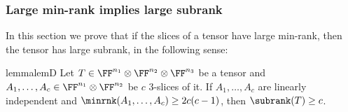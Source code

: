 \subsubsection{Large min-rank implies large subrank}\label{subsec:minrank-subrank}

In this section we prove that if the slices of a tensor have large min-rank, then the tensor has large subrank, in the following sense:


\begin{restatable}{lemma}{lemD}
%
\label{cla-high-rank-high-subrank}
Let $T\in\FF^{n_1}\otimes\FF^{n_2}\otimes\FF^{n_3}$ be a tensor and $A_1,\ldots,A_c\in\FF^{n_1}\otimes\FF^{n_2}$ be $c$ 3-slices of it. %
If $A_1,\ldots,A_c$ are linearly independent and  $\minrnk(A_1,\dots,A_c)\geq 2c(c-1)$,
then $\subrank(T)\geq c$.    
%
\end{restatable}
%
%
%
%

%
%
%

%
%
%
%


%

%

%

%
%

%
%
%

